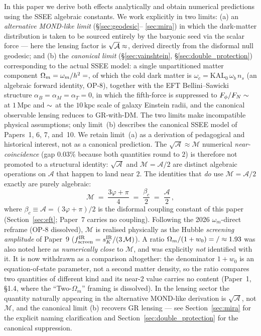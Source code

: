 \documentclass[12pt,a4paper]{article}
\newcommand{\phiG}{\varphi}
\newcommand{\MIRA}{\mathcal{M}}
\newcommand{\AURA}{\mathcal{A}}
\newcommand{\bc}{\beta_c}
\begin{document}
In this paper we derive both effects analytically and obtain numerical
predictions using the SSEE algebraic constants. We work explicitly in two
limits: (a) an \emph{alternative MOND-like limit} (\S\ref{sec:geodesic}--
\ref{sec:mira}) in which the dark-matter distribution is taken to be sourced
entirely by the baryonic seed via the scalar force — here the lensing factor
is $\sqrt{\AURA}\approx \val{sqrt_AURA_d4}$, derived directly from the disformal null
geodesic; and (b) the \emph{canonical limit}
(\S\ref{sec:vainshtein}, \S\ref{sec:double_protection}) corresponding to the
actual SSEE model: a single unpartitioned matter component
$\Omega_m=\omega_m/h^2=\val{OMEGA_M_TOTAL_d6}$, of which the cold dark matter is
$\omega_c=\mathrm{KAL}_0\,\omega_b\,n_s$ (an algebraic forward identity,
OP-8), together with the EFT
Bellini--Sawicki structure $\alpha_B=\alpha_M=\alpha_T=0$, in which the
fifth-force is suppressed to $F_\phi/F_N\sim\val{quinta_fuerza_Mpc}$ at $1\,\mathrm{Mpc}$ and $\sim\val{quinta_fuerza_10kpc}$ at the $10\,\mathrm{kpc}$ scale of galaxy Einstein radii, and
the canonical observable lensing reduces to GR-with-DM.
The two limits make incompatible physical assumptions; only limit~(b)
describes the canonical SSEE model of Papers~1, 6, 7, and~10. We retain
limit~(a) as a derivation of pedagogical and historical interest, not as a
canonical prediction. The $\sqrt{\AURA}\approx \MIRA$ numerical
\emph{near-coincidence} (gap $0.03\%$ because both quantities round to $2$)
is therefore not promoted to a structural identity:
$\sqrt{\AURA}$ and $\MIRA=\AURA/2$ are distinct algebraic operations on
$\AURA$ that happen to land near $2$.
The identities that \emph{do} use $\MIRA = \AURA/2$ exactly are purely algebraic:
\begin{equation}
  \MIRA \;=\; \frac{3\phiG + \pi}{4} \;=\; \frac{\bc}{2} \;=\; \frac{\AURA}{2}\,,
  \label{eq:mira_def}
\end{equation}
where $\bc \equiv \AURA = (3\phiG+\pi)/2$ is the disformal coupling
constant of this paper (Section~\ref{sec:eft}; Paper~7 carries no coupling). Following the 2026 $\omega_m$-direct reframe
(OP-8 dissolved), $\MIRA$ is realised physically as the Hubble \emph{screening
amplitude} of Paper~9 ($f_{\rm screen}^{\rm IR}=s_K^{\rm IR}/(3\,\MIRA)$). A ratio
$\Omega_m/(1+w_0)=\val{OMEGA_M_TOTAL_d6}/\val{S_M_d6}\approx1.93$ was also noted here as
\emph{numerically close} to $\MIRA$, and was explicitly \emph{not} identified
with it. It is now withdrawn as a comparison altogether: the denominator
$1+w_0$ is an equation-of-state parameter, not a second matter density, so the
ratio compares two quantities of different kind and its near-$2$ value carries
no content (Paper~1, \S1.4, where the ``Two-$\Omega_m$'' framing is
dissolved). In the lensing sector the quantity
naturally appearing in the alternative MOND-like derivation is
$\sqrt{\AURA}$, not $\MIRA$, and the canonical limit (b) recovers GR
lensing — see Section~\ref{sec:mira} for the explicit naming clarification
and Section~\ref{sec:double_protection} for the canonical suppression.
\end{document}
